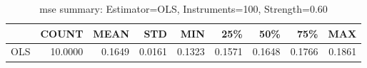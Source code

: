 \begin{table}[ht]
\centering
\caption{mse summary: Estimator=OLS, Instruments=100, Strength=0.60}
\begin{tabular}{lrrrrrrrr}
\toprule
 & COUNT & MEAN & STD & MIN & 25\% & 50\% & 75\% & MAX \\
\midrule
OLS & 10.0000 & 0.1649 & 0.0161 & 0.1323 & 0.1571 & 0.1648 & 0.1766 & 0.1861 \\
\bottomrule
\end{tabular}
\end{table}
